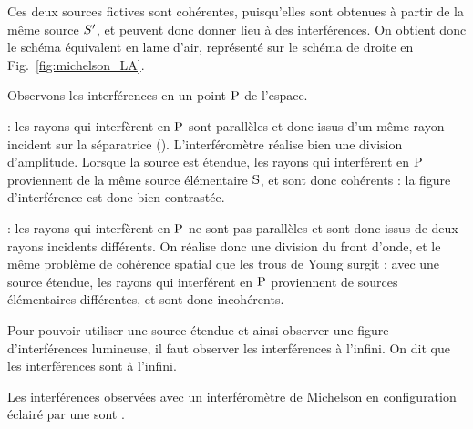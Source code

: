 \documentclass[12pt,fancy]{cours}
\begin{document}
Ces deux sources fictives sont cohérentes, puisqu'elles sont obtenues à partir de la même source  $S'$, et peuvent donc donner lieu à des interférences. On obtient donc le schéma équivalent en lame d'air, représenté sur le schéma de droite en Fig.~\ref{fig:michelson_LA}.



  Observons les interférences en un point $\rm P$ de l'espace. 
 \begin{liste}
  \item {} : les rayons qui interfèrent en $\rm P$ sont parallèles et donc issus d'un même rayon incident sur la séparatrice (). L'interféromètre réalise bien une division d'amplitude. Lorsque la source est étendue, les rayons qui interférent en $\rm P$ proviennent de la même source élémentaire $\rm S$, et sont donc cohérents : la figure d'interférence est donc bien contrastée. 
  \item {} : les rayons qui interfèrent en $\rm P$ ne sont pas parallèles et sont donc issus de deux rayons incidents différents. On réalise donc une division du front d’onde, et le même problème de cohérence spatial que les trous de Young surgit : avec une source étendue, les rayons qui interférent en $\rm P$ proviennent de sources élémentaires différentes, et sont donc incohérents. 
 \end{liste}
 Pour pouvoir utiliser une source étendue et ainsi observer une figure d'interférences lumineuse, il faut observer les interférences à l'infini. On dit que les interférences sont  à l'infini.

 \begin{prop}\label{prop:}
 Les interférences observées avec un interféromètre de Michelson en configuration  éclairé par une  sont .
 \end{prop}
\end{document}
